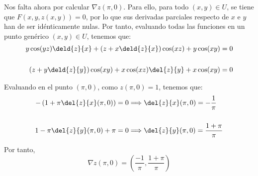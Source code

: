 \begin{ejercicio}
    Nos falta ahora por calcular $\nabla z(\pi,0)$. Para ello, para todo $(x,y)\in U$, se tiene que $F(x,y,z(x,y))=0$, por lo que sus derivadas parciales respecto de $x$ e $y$ han de ser idénticamente nulas.
    Por tanto, evaluando todas las funciones en un punto genérico $(x,y)\in U$, tenemos que:
    \begin{align*}
        y\cos(yz) \deld{z}{x} + \left(z+x\deld{z}{x}\right)\cos(xz) +y \cos(xy) &= 0 \\ \\
        \left(z+y\deld{z}{y}\right)\cos(xy) +x \cos(xz)\del{z}{y} + x\cos(xy) &= 0
    \end{align*}

    Evaluando en el punto $(\pi,0)$, como $z(\pi,0)=1$, tenemos que:
    \begin{align*}
        -\left(1+\pi\del{z}{x}(\pi, 0)\right) &= 0 \Longrightarrow \del{z}{x}(\pi, 0) = -\frac{1}{\pi} \\ \\
        1-\pi\del{z}{y}(\pi, 0) + \pi &= 0 \Longrightarrow \del{z}{y}(\pi, 0) = \frac{1+\pi}{\pi}
    \end{align*}

    Por tanto,
    \begin{equation*}
        \nabla z(\pi,0) = \left(
                \frac{-1}{\pi} , \frac{1+\pi}{\pi}
        \right)
    \end{equation*}
    
\end{ejercicio}